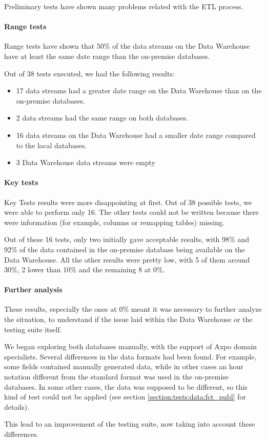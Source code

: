Preliminary tests have shown many problems related with the ETL process.

\paragraph{Range tests}
    Range tests have shown that 50\% of the data streams on the Data Warehouse have at least the same date range than the on-premise databases.
    
    Out of 38 tests executed, we had the following results:
    \begin{itemize}
        \item 17 data streams had a greater date range on the Data Warehouse than on the on-premise databases.
        \item 2 data streams had the same range on both databases.
        \item 16 data streams on the Data Warehouse had a smaller date range compared to the local databases.
        \item 3 Data Warehouse data streams were empty
    \end{itemize}

\paragraph{Key tests}
    Key Tests results were more disappointing at first.
    Out of 38 possible tests, we were able to perform only 16.
    The other tests could not be written because there were information (for example, columns or remapping tables) missing.
    
    Out of these 16 tests, only two initially gave acceptable results, with 98\% and 92\% of the data contained in the on-premise database being available on the Data Warehouse.
    All the other results were pretty low, with 5 of them around 30\%, 2 lower than 10\% and the remaining 8 at 0\%.
    
\paragraph{Further analysis}
    These results, especially the ones at 0\% meant it was necessary to further analyze the situation, to understand if the issue laid within the Data Warehouse or the testing suite itself.
    
    We began exploring both databases manually, with the support of Axpo domain specialists.
    Several differences in the data formats had been found.
    For example, some fields contained manually generated data, while in other cases an hour notation different from the standard format was used in the on-premise databases.
    In some other cases, the data was supposed to be different, so this kind of test could not be applied (see section \ref{section:tests:data:fct_publ} for details).
    
    This lead to an improvement of the testing suite, now taking into account these differences.

